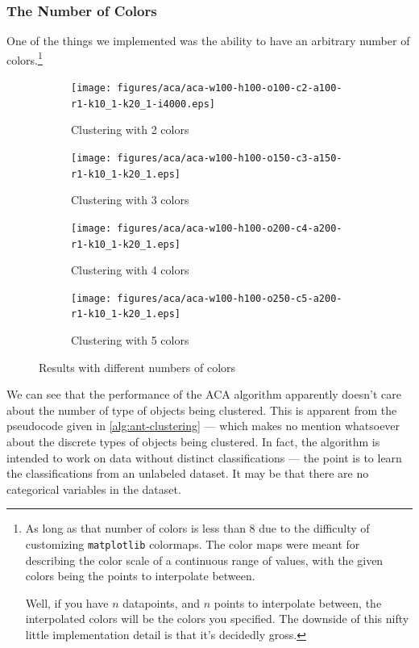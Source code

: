 \documentclass[12pt]{article}
\begin{document}
\subsubsection{The Number of Colors}
One of the things we implemented was the ability to have an arbitrary number of colors.\footnote{As long as that number of colors is less than 8 due to the difficulty of customizing \texttt{matplotlib} colormaps. The color maps were meant for describing the color scale of a continuous range of values, with the given colors being the points to interpolate between.

    Well, if you have $n$ datapoints, and $n$ points to interpolate between, the interpolated colors will be the colors you specified. The downside of this nifty little implementation detail is that it's decidedly gross.}

\begin{figure}[H]
    \centering
    \begin{subfigure}[t]{0.4\textwidth}
        \centering
        \texttt{[image: figures/aca/aca-w100-h100-o100-c2-a100-r1-k10\_1-k20\_1-i4000.eps]}
        \caption{Clustering with 2 colors}\label{fig:aca:colors-2}
    \end{subfigure}%
    \begin{subfigure}[t]{0.4\textwidth}
        \centering
        \texttt{[image: figures/aca/aca-w100-h100-o150-c3-a150-r1-k10\_1-k20\_1.eps]}
        \caption{Clustering with 3 colors}\label{fig:aca:colors-3}
    \end{subfigure}%

    \begin{subfigure}[b]{0.4\textwidth}
        \centering
        \texttt{[image: figures/aca/aca-w100-h100-o200-c4-a200-r1-k10\_1-k20\_1.eps]}
        \caption{Clustering with 4 colors}\label{fig:aca:colors-4}
    \end{subfigure}%
    \begin{subfigure}[b]{0.4\textwidth}
        \centering
        \texttt{[image: figures/aca/aca-w100-h100-o250-c5-a200-r1-k10\_1-k20\_1.eps]}
        \caption{Clustering with 5 colors}\label{fig:aca:colors-5}
    \end{subfigure}
    \caption{Results with different numbers of colors}\label{fig:aca:colors}
\end{figure}

We can see that the performance of the ACA algorithm apparently doesn't care about the number of type of objects being clustered.
This is apparent from the pseudocode given in \autoref{alg:ant-clustering} --- which makes no mention whatsoever about the discrete types of objects being clustered.
In fact, the algorithm is intended to work on data without distinct classifications --- the point is to learn the classifications from an unlabeled dataset.
It may be that there are no categorical variables in the dataset.
\end{document}
